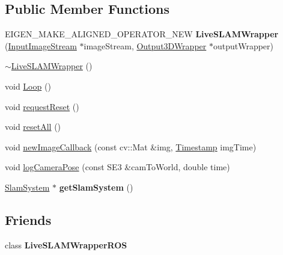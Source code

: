 \subsection*{Public Member Functions}
\begin{DoxyCompactItemize}
\item 
\hypertarget{structlsd__slam_1_1_live_s_l_a_m_wrapper_a5eb56c2d74bb9b1f62e255f66361a1df}{E\-I\-G\-E\-N\-\_\-\-M\-A\-K\-E\-\_\-\-A\-L\-I\-G\-N\-E\-D\-\_\-\-O\-P\-E\-R\-A\-T\-O\-R\-\_\-\-N\-E\-W {\bfseries Live\-S\-L\-A\-M\-Wrapper} (\hyperlink{classlsd__slam_1_1_input_image_stream}{Input\-Image\-Stream} $\ast$image\-Stream, \hyperlink{classlsd__slam_1_1_output3_d_wrapper}{Output3\-D\-Wrapper} $\ast$output\-Wrapper)}\label{structlsd__slam_1_1_live_s_l_a_m_wrapper_a5eb56c2d74bb9b1f62e255f66361a1df}

\item 
\hyperlink{structlsd__slam_1_1_live_s_l_a_m_wrapper_a2e30a399280b41b721fe4a3a7cde580c}{$\sim$\-Live\-S\-L\-A\-M\-Wrapper} ()
\item 
void \hyperlink{structlsd__slam_1_1_live_s_l_a_m_wrapper_acca18b3dfae9dbfdb263fe5e40b03620}{Loop} ()
\item 
void \hyperlink{structlsd__slam_1_1_live_s_l_a_m_wrapper_af8c039c0c5a958f81aae837ceb01f1ff}{request\-Reset} ()
\item 
void \hyperlink{structlsd__slam_1_1_live_s_l_a_m_wrapper_aae9dfbb330f310d4f546456981459820}{reset\-All} ()
\item 
void \hyperlink{structlsd__slam_1_1_live_s_l_a_m_wrapper_a74585ef613514945d32c8594d3d24741}{new\-Image\-Callback} (const cv\-::\-Mat \&img, \hyperlink{classlsd__slam_1_1_timestamp}{Timestamp} img\-Time)
\item 
void \hyperlink{structlsd__slam_1_1_live_s_l_a_m_wrapper_a7324cecc197f65e911f6526fb3c3ac19}{log\-Camera\-Pose} (const S\-E3 \&cam\-To\-World, double time)
\item 
\hypertarget{structlsd__slam_1_1_live_s_l_a_m_wrapper_ac0f6675577df26d98c22e2549f3fcb19}{\hyperlink{classlsd__slam_1_1_slam_system}{Slam\-System} $\ast$ {\bfseries get\-Slam\-System} ()}\label{structlsd__slam_1_1_live_s_l_a_m_wrapper_ac0f6675577df26d98c22e2549f3fcb19}

\end{DoxyCompactItemize}
\subsection*{Friends}
\begin{DoxyCompactItemize}
\item 
\hypertarget{structlsd__slam_1_1_live_s_l_a_m_wrapper_ab3d0959819168d455e4122fa021df560}{class {\bfseries Live\-S\-L\-A\-M\-Wrapper\-R\-O\-S}}\label{structlsd__slam_1_1_live_s_l_a_m_wrapper_ab3d0959819168d455e4122fa021df560}

\end{DoxyCompactItemize}
